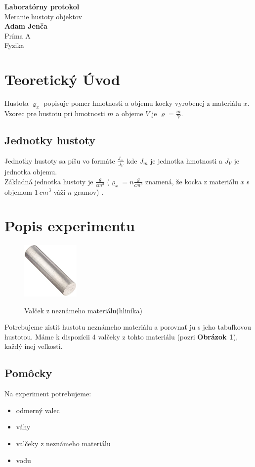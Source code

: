 \documentclass{article}
\begin{document}
\begin{center}
\vskip 1cm
\Huge
\textbf{Laboratórny protokol}\\
\medskip
\LARGE
Meranie hustoty objektov\\
\medskip
\textbf{Adam Jenča}\\
\medskip
\large
Príma A\\
\medskip
Fyzika
\vskip  3cm
\tableofcontents
\end{center}
\newpage
\large
\section{Teoretický Úvod}
Hustota $\varrho_x$ popisuje pomer hmotnosti a objemu  kocky vyrobenej z materiálu $x$.\\
Vzorec pre hustotu pri hmotnosti $m$ a objeme $V$ je $\varrho = \frac{m}{V}$.
\subsection{Jednotky hustoty}
Jednotky hustoty sa píšu vo formáte $\frac{J_m}{J_V}$ kde $J_m$ je jednotka hmotnosti a $J_V$ je jednotka objemu.\\
Základná jednotka hustoty je $\frac{g}{cm^3}$ ($\varrho_x = n\frac{g}{cm^3}$ znamená, že kocka z materiálu $x$ s objemom $1\ cm^3$ váži $n$ gramov) .
\section{Popis experimentu}
\begin{figure}[h]
    \centering
    \includegraphics[width=0.25\textwidth]{al.jpg}
    \label{fig:valec}

    \caption{Valček z neznámeho materiálu(hliníka)}
    \end{figure}
Potrebujeme zistiť hustotu neznámeho materiálu a porovnať ju s jeho tabuľkovou hustotou. Máme k dispozícii 4 valčeky z tohto materiálu (pozri \textbf{Obrázok 1}), každý inej veľkosti.
\subsection{Pomôcky}
Na experiment potrebujeme:
\begin{itemize}
 \item  odmerný valec
 \item  váhy
 \item  valčeky z neznámeho materiálu
 \item  vodu
\end{itemize}
\end{document}
